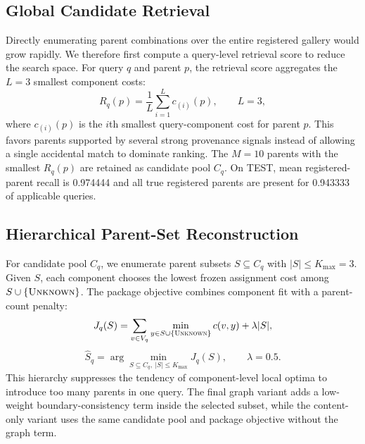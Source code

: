 \documentclass[runningheads]{llncs}
\begin{document}
\subsection{Global Candidate Retrieval}

Directly enumerating parent combinations over the entire registered gallery would grow rapidly. We therefore first compute a query-level retrieval score to reduce the search space. For query $q$ and parent $p$, the retrieval score aggregates the $L=3$ smallest component costs:
\[
R_q(p)=\frac{1}{L}\sum_{i=1}^{L}c_{(i)}(p),\qquad L=3,
\]
where $c_{(i)}(p)$ is the $i$th smallest query-component cost for parent $p$. This favors parents supported by several strong provenance signals instead of allowing a single accidental match to dominate ranking. The $M=10$ parents with the smallest $R_q(p)$ are retained as candidate pool $C_q$. On TEST, mean registered-parent recall is 0.974444 and all true registered parents are present for 0.943333 of applicable queries.

\subsection{Hierarchical Parent-Set Reconstruction}

For candidate pool $C_q$, we enumerate parent subsets $S\subseteq C_q$ with $|S|\le K_{\max}=3$. Given $S$, each component chooses the lowest frozen assignment cost among $S\cup\{\textsc{Unknown}\}$. The package objective combines component fit with a parent-count penalty:
\[
J_q(S)=\sum_{v\in V_q}\min_{y\in S\cup\{\textsc{Unknown}\}} c(v,y)+\lambda |S|,
\]
\[
\hat S_q=\arg\min_{S\subseteq C_q,\ |S|\le K_{\max}}J_q(S),\qquad \lambda=0.5.
\]
This hierarchy suppresses the tendency of component-level local optima to introduce too many parents in one query. The final graph variant adds a low-weight boundary-consistency term inside the selected subset, while the content-only variant uses the same candidate pool and package objective without the graph term.
\end{document}
